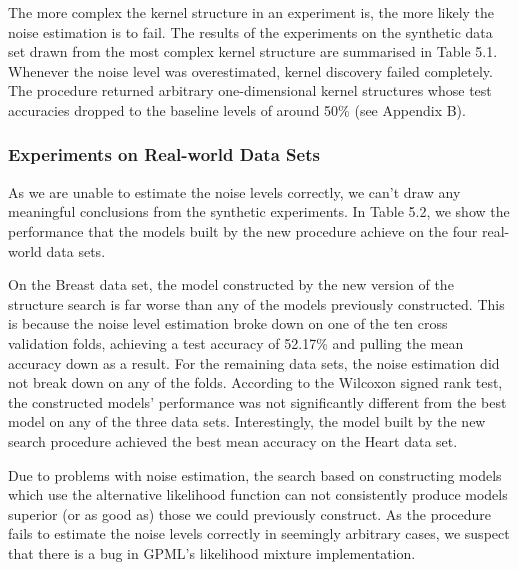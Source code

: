 \documentclass[a4paper,12pt ]{report}
\begin{document}
The more complex the kernel structure in an experiment is, the more likely the noise estimation is to fail. The results of the experiments on the synthetic data set drawn from the most complex kernel structure are summarised in Table 5.1. Whenever the noise level was overestimated, kernel discovery failed completely. The procedure returned arbitrary one-dimensional kernel structures whose test accuracies dropped to the baseline levels of around 50\% (see Appendix B).




\subsubsection*{Experiments on Real-world Data Sets}

As we are unable to estimate the noise levels correctly, we can't draw any meaningful conclusions from the synthetic experiments. In Table 5.2, we show the performance that the models built by the new procedure achieve on the four real-world data sets.




On the Breast data set, the model constructed by the new version of the structure search is far worse than any of the models previously constructed. This is because the noise level estimation broke down on one of the ten cross validation folds, achieving a test accuracy of 52.17\% and pulling the mean accuracy down as a result. For the remaining data sets, the noise estimation did not break down on any of the folds. According to the Wilcoxon signed rank test, the constructed models' performance was not significantly different from the best model on any of the three data sets. Interestingly, the model built by the new search procedure achieved the best mean accuracy on the Heart data set.

Due to problems with noise estimation, the search based on constructing models which use the alternative likelihood function can not consistently produce models superior (or as good as) those we could previously construct. As the procedure fails to estimate the noise levels correctly in seemingly arbitrary cases, we suspect that there is a bug in GPML's likelihood mixture implementation.
\end{document}
